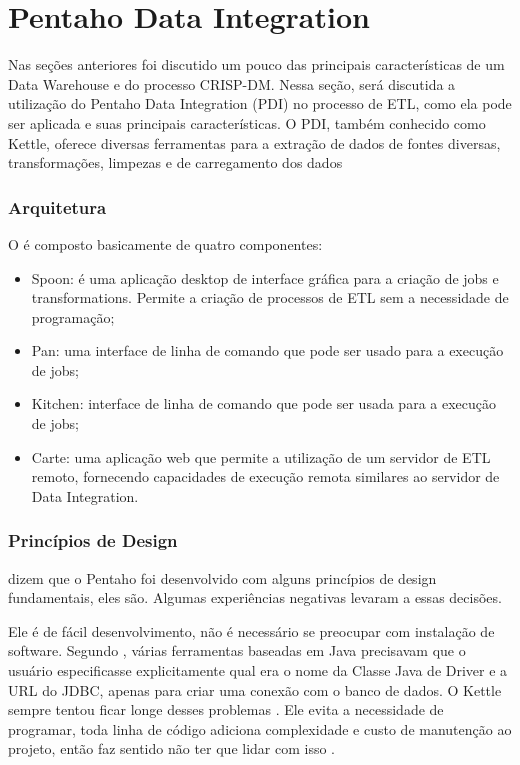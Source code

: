 \section{Pentaho Data Integration}
Nas seções anteriores foi discutido um pouco das principais características de um Data Warehouse e do processo CRISP-DM. Nessa seção, será discutida a utilização do Pentaho Data Integration (PDI) no processo de ETL, como ela pode ser aplicada e suas principais características.
O PDI, também conhecido como Kettle, oferece diversas ferramentas para a extração de dados de fontes diversas, transformações, limpezas e de carregamento dos dados
\subsubsection{Arquitetura}
O \pdi é composto basicamente de quatro componentes:
\begin{itemize}
    \item Spoon: é uma aplicação desktop de interface gráfica para a criação de jobs e transformations. Permite a criação de processos de ETL sem a necessidade de programação;
    \item Pan: uma interface de linha de comando que pode ser usado para a execução de jobs;
    \item Kitchen: interface de linha de comando que pode ser usada para a execução de jobs;
    \item Carte: uma aplicação web que permite a utilização de um servidor de ETL remoto, fornecendo capacidades de execução remota similares ao servidor de Data Integration.
\end{itemize}

\subsubsection{Princípios de Design}
 dizem que o Pentaho foi desenvolvido com alguns princípios de design fundamentais, eles são. Algumas experiências negativas levaram a essas decisões.

Ele é de fácil desenvolvimento, não é necessário se preocupar com instalação de software. Segundo , várias ferramentas baseadas em Java precisavam que o usuário especificasse explicitamente qual era o nome da Classe Java de Driver e a URL do JDBC, apenas para criar uma conexão com o banco de dados. O Kettle sempre tentou ficar longe desses problemas \citep{kettle}. Ele evita a necessidade de programar, toda linha de código adiciona complexidade e custo de manutenção ao projeto, então faz sentido não ter que lidar com isso \citep{kettle}.

